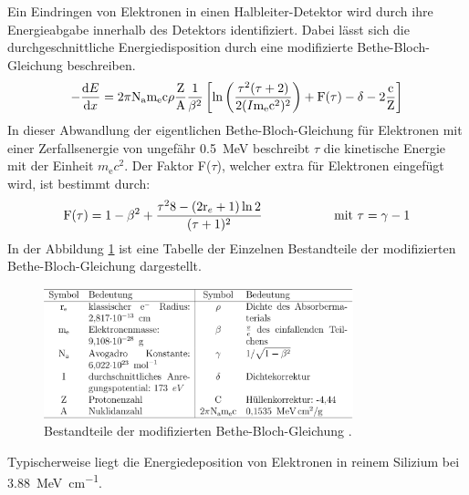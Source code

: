 Ein Eindringen von Elektronen in einen Halbleiter-Detektor wird durch
ihre Energieabgabe innerhalb des Detektors identifiziert. Dabei lässt sich die
durchgeschnittliche Energiedisposition durch eine modifizierte Bethe-Bloch-Gleichung
beschreiben.
\begin{equation*}
  -\frac{\text{d}E}{\text{d}x} =
  2\pi \text{N}_\text{a} \text{m}_\text{e} \text{c}\rho \frac{\text{Z}}{\text{A}}\frac{1}{\beta^2}
  \left[\text{ln}\left(\frac{\tau^2(\tau + 2)}{2(I\/\text{m}_\text{e}\text{c}^2)^2}\right)
  + \text{F}(\tau) - \delta - 2\frac{\text{c}}{\text{Z}}\right]
\end{equation*}
In dieser Abwandlung der eigentlichen Bethe-Bloch-Gleichung für Elektronen mit einer
Zerfallsenergie von ungefähr \SI{0.5}{\mega\electronvolt}
beschreibt $\tau$ die kinetische Energie mit der Einheit $m_\text{e} c^2$. Der
Faktor F($\tau$), welcher extra für Elektronen eingefügt wird, ist bestimmt durch:
\begin{equation*}
  \text{F}(\tau) = 1 - \beta^2 + \frac{\tau^2\/8 - (2\text{r}_e + 1) \ln2}{(\tau + 1)^2}
  \hspace{2cm}\text{mit } \tau = \gamma - 1
\end{equation*}
In der Abbildung \ref{fig:tab} ist eine Tabelle der Einzelnen Bestandteile der
modifizierten Bethe-Bloch-Gleichung dargestellt.
\begin{figure}[htb]
  \centering
  \includegraphics[width=0.8\textwidth]{images/Tabelle.png}
  \caption{Bestandteile der modifizierten Bethe-Bloch-Gleichung \cite{anleitung}.}
  \label{fig:tab}
\end{figure}
Typischerweise liegt die Energiedeposition von Elektronen in reinem Silizium bei
\SI{3.88}{\mega\electronvolt\per\centi\meter}.

\FloatBarrier
